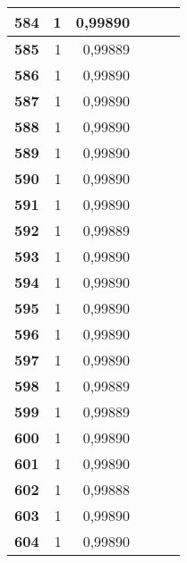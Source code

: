 {\begin{longtable}{|r|r|r|l|r|r|}
\textbf{584} & 1 & 0,99890 &  & \multicolumn{1}{l|}{} & \multicolumn{1}{l|}{} \\ \hline
\textbf{585} & 1 & 0,99889 &  & \multicolumn{1}{l|}{} & \multicolumn{1}{l|}{} \\ \hline
\textbf{586} & 1 & 0,99890 &  & \multicolumn{1}{l|}{} & \multicolumn{1}{l|}{} \\ \hline
\textbf{587} & 1 & 0,99890 &  & \multicolumn{1}{l|}{} & \multicolumn{1}{l|}{} \\ \hline
\textbf{588} & 1 & 0,99890 &  & \multicolumn{1}{l|}{} & \multicolumn{1}{l|}{} \\ \hline
\textbf{589} & 1 & 0,99890 &  & \multicolumn{1}{l|}{} & \multicolumn{1}{l|}{} \\ \hline
\textbf{590} & 1 & 0,99890 &  & \multicolumn{1}{l|}{} & \multicolumn{1}{l|}{} \\ \hline
\textbf{591} & 1 & 0,99890 &  & \multicolumn{1}{l|}{} & \multicolumn{1}{l|}{} \\ \hline
\textbf{592} & 1 & 0,99889 &  & \multicolumn{1}{l|}{} & \multicolumn{1}{l|}{} \\ \hline
\textbf{593} & 1 & 0,99890 &  & \multicolumn{1}{l|}{} & \multicolumn{1}{l|}{} \\ \hline
\textbf{594} & 1 & 0,99890 &  & \multicolumn{1}{l|}{} & \multicolumn{1}{l|}{} \\ \hline
\textbf{595} & 1 & 0,99890 &  & \multicolumn{1}{l|}{} & \multicolumn{1}{l|}{} \\ \hline
\textbf{596} & 1 & 0,99890 &  & \multicolumn{1}{l|}{} & \multicolumn{1}{l|}{} \\ \hline
\textbf{597} & 1 & 0,99890 &  & \multicolumn{1}{l|}{} & \multicolumn{1}{l|}{} \\ \hline
\textbf{598} & 1 & 0,99889 &  & \multicolumn{1}{l|}{} & \multicolumn{1}{l|}{} \\ \hline
\textbf{599} & 1 & 0,99889 &  & \multicolumn{1}{l|}{} & \multicolumn{1}{l|}{} \\ \hline
\textbf{600} & 1 & 0,99890 &  & \multicolumn{1}{l|}{} & \multicolumn{1}{l|}{} \\ \hline
\textbf{601} & 1 & 0,99890 &  & \multicolumn{1}{l|}{} & \multicolumn{1}{l|}{} \\ \hline
\textbf{602} & 1 & 0,99888 &  & \multicolumn{1}{l|}{} & \multicolumn{1}{l|}{} \\ \hline
\textbf{603} & 1 & 0,99890 &  & \multicolumn{1}{l|}{} & \multicolumn{1}{l|}{} \\ \hline
\textbf{604} & 1 & 0,99890 &  & \multicolumn{1}{l|}{} & \multicolumn{1}{l|}{} \\ \hline

\end{longtable}}

